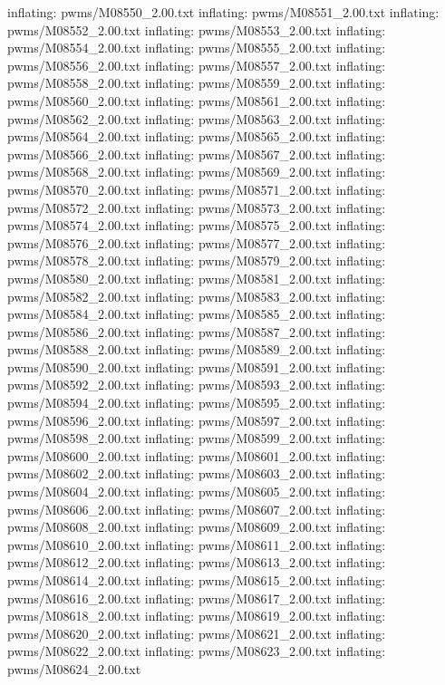 \documentclass[letterpaper,10pt,english]{sphinxmanual}
\begin{document}
{\begin{sphinxVerbatim}[commandchars=\\\{\}]
  inflating: pwms/M08550\_2.00.txt
  inflating: pwms/M08551\_2.00.txt
  inflating: pwms/M08552\_2.00.txt
  inflating: pwms/M08553\_2.00.txt
  inflating: pwms/M08554\_2.00.txt
  inflating: pwms/M08555\_2.00.txt
  inflating: pwms/M08556\_2.00.txt
  inflating: pwms/M08557\_2.00.txt
  inflating: pwms/M08558\_2.00.txt
  inflating: pwms/M08559\_2.00.txt
  inflating: pwms/M08560\_2.00.txt
  inflating: pwms/M08561\_2.00.txt
  inflating: pwms/M08562\_2.00.txt
  inflating: pwms/M08563\_2.00.txt
  inflating: pwms/M08564\_2.00.txt
  inflating: pwms/M08565\_2.00.txt
  inflating: pwms/M08566\_2.00.txt
  inflating: pwms/M08567\_2.00.txt
  inflating: pwms/M08568\_2.00.txt
  inflating: pwms/M08569\_2.00.txt
  inflating: pwms/M08570\_2.00.txt
  inflating: pwms/M08571\_2.00.txt
  inflating: pwms/M08572\_2.00.txt
  inflating: pwms/M08573\_2.00.txt
  inflating: pwms/M08574\_2.00.txt
  inflating: pwms/M08575\_2.00.txt
  inflating: pwms/M08576\_2.00.txt
  inflating: pwms/M08577\_2.00.txt
  inflating: pwms/M08578\_2.00.txt
  inflating: pwms/M08579\_2.00.txt
  inflating: pwms/M08580\_2.00.txt
  inflating: pwms/M08581\_2.00.txt
  inflating: pwms/M08582\_2.00.txt
  inflating: pwms/M08583\_2.00.txt
  inflating: pwms/M08584\_2.00.txt
  inflating: pwms/M08585\_2.00.txt
  inflating: pwms/M08586\_2.00.txt
  inflating: pwms/M08587\_2.00.txt
  inflating: pwms/M08588\_2.00.txt
  inflating: pwms/M08589\_2.00.txt
  inflating: pwms/M08590\_2.00.txt
  inflating: pwms/M08591\_2.00.txt
  inflating: pwms/M08592\_2.00.txt
  inflating: pwms/M08593\_2.00.txt
  inflating: pwms/M08594\_2.00.txt
  inflating: pwms/M08595\_2.00.txt
  inflating: pwms/M08596\_2.00.txt
  inflating: pwms/M08597\_2.00.txt
  inflating: pwms/M08598\_2.00.txt
  inflating: pwms/M08599\_2.00.txt
  inflating: pwms/M08600\_2.00.txt
  inflating: pwms/M08601\_2.00.txt
  inflating: pwms/M08602\_2.00.txt
  inflating: pwms/M08603\_2.00.txt
  inflating: pwms/M08604\_2.00.txt
  inflating: pwms/M08605\_2.00.txt
  inflating: pwms/M08606\_2.00.txt
  inflating: pwms/M08607\_2.00.txt
  inflating: pwms/M08608\_2.00.txt
  inflating: pwms/M08609\_2.00.txt
  inflating: pwms/M08610\_2.00.txt
  inflating: pwms/M08611\_2.00.txt
  inflating: pwms/M08612\_2.00.txt
  inflating: pwms/M08613\_2.00.txt
  inflating: pwms/M08614\_2.00.txt
  inflating: pwms/M08615\_2.00.txt
  inflating: pwms/M08616\_2.00.txt
  inflating: pwms/M08617\_2.00.txt
  inflating: pwms/M08618\_2.00.txt
  inflating: pwms/M08619\_2.00.txt
  inflating: pwms/M08620\_2.00.txt
  inflating: pwms/M08621\_2.00.txt
  inflating: pwms/M08622\_2.00.txt
  inflating: pwms/M08623\_2.00.txt
  inflating: pwms/M08624\_2.00.txt

\end{sphinxVerbatim}}
\end{document}
